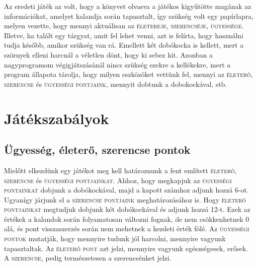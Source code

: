 \documentclass[12pt,a4paper,oneside]{report}
\newcommand{\stat}{\textsc}
\begin{document}
  Az eredeti játék az volt, hogy a könyvet olvasva a játékos
  kigyűtötte magának az információkat, amelyet kalandja során
  tapasztalt, így szükség volt egy papírlapra, melyen vezette, hogy
  mennyi aktuálisan az \stat{életereje}, \stat{szerencséje},
  \stat{ügyessége}. Illetve, ha talált egy tárgyat, amit fel lehet
  venni, azt is felírta, hogy használni tudja később, amikor szükség
  van rá. Emellett két dobókocka is kellett, mert a szörnyek elleni
  harcnál a véletlen dönt, hogy ki sebez kit. Azonban a nagyprogramom
  végigjátszásánál nincs szükség ezekre a kellékekre, mert a program
  állapota tárolja, hogy milyen eszközöket vettünk fel, mennyi az
  \stat{életerő}, \stat{szerencse} és \stat{ügyességi pontjaink},
  mennyit dobtunk a dobokockával, stb.
  

    \section{Játékszabályok}
  
      \subsection{Ügyesség, életerő, szerencse pontok}
        Mielőtt elkezdünk egy játékot meg kell határoznunk a fent
        említett \stat{életerő}, \stat{szerencse} és \stat{ügyességi
        pontjainkat}. Ahhoz, hogy megkapjuk az \stat{ügyességi
        pontainkat} dobjunk a dobókockával, majd a kapott számhoz
        adjunk hozzá 6-ot. Ugyanígy járjunk el a \stat{szerencse
        pontjaink} meghatározásához is. Hogy \stat{életerő
        pontjainkat} megtudjuk dobjunk két dobókockával és adjunk
        hozzá 12-t. Ezek az értékek a kalandok során folyamatosan
        változni fognak, de nem csökkenhetnek 0 alá, és pont
        visszaszerzés során nem mehetnek a kezdeti érték fölé. Az
        \stat{ügyességi pontok} mutatják, hogy mennyire tudunk jól
        harcolni, mennyire vagyunk tapasztaltak. Az \stat{életerő
        pont} azt jelzi, mennyire vagyunk egészségesek, erősek. A
        \stat{szerencse}, pedig természetesen a szerencsénket jelzi.
    
\end{document}
